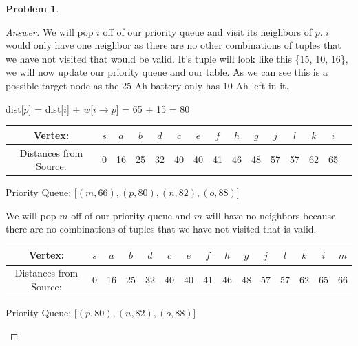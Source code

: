 \documentclass[11pt]{article}
\theoremstyle{definition}
\theoremstyle{definition}
\newtheorem{required}{Problem}
\theoremstyle{definition}
\begin{document}
\begin{required}
\begin{enumerate}[label=(\alph*)]
\begin{proof}[Answer]
We will pop $i$ off of our priority queue and visit its neighbors of $p$. $i$ would only have one neighbor as there are no other combinations of tuples that we have not visited that would be valid. It's tuple will look like this \{15, 10, 16\}, we will now update our priority queue and our table. As we can see this is a possible target node as the 25 Ah battery only has 10 Ah left in it.
\begin{center}
dist[$p$] = dist[$i$]  + $w$[$i \rightarrow p$] = 65 + 15 = 80 \\
\begin{tabular}{ | c | c | c | c | c | c | c | c | c | c | c | c | c | c | c |}
 \hline
 Vertex:& $s$ & $a$ & $b$ & $d$ & $c$ & $e$ & $f$ & $h$ & $g$ & $j$ & $l$ & $k$ & $i$\\ 
 \hline
 Distances from Source:& 0 & 16 & 25 & 32 & 40 & 40 & 41 & 46 & 48 & 57 & 57 & 62 & 65 \\  
 \hline
\end{tabular}
\end{center}
\begin{center}
Priority Queue: [$(m, 66), (p, 80), (n, 82), (o, 88)$]
\end{center}

We will pop $m$ off of our priority queue and $m$ will have no neighbors because there are no combinations of tuples that we have not visited that is valid. 
\begin{center}
\begin{tabular}{ | c | c | c | c | c | c | c | c | c | c | c | c | c | c | c |}
 \hline
 Vertex:& $s$ & $a$ & $b$ & $d$ & $c$ & $e$ & $f$ & $h$ & $g$ & $j$ & $l$ & $k$ & $i$ & $m$\\ 
 \hline
 Distances from Source:& 0 & 16 & 25 & 32 & 40 & 40 & 41 & 46 & 48 & 57 & 57 & 62 & 65 & 66\\  
 \hline
\end{tabular}
\end{center}
\begin{center}
Priority Queue: [$(p, 80), (n, 82), (o, 88)$]
\end{center}


\end{proof}
\end{enumerate}
\end{required}
\end{document}
